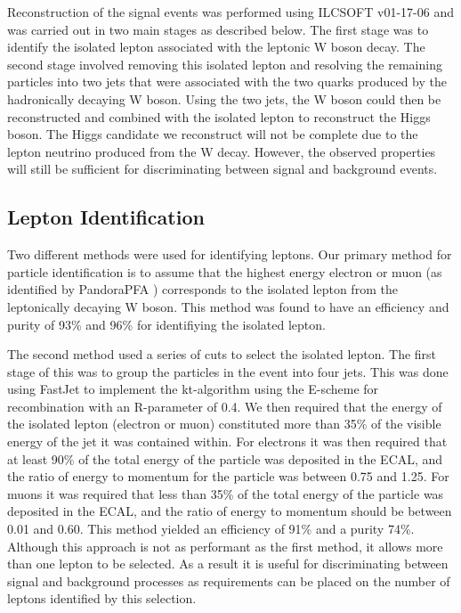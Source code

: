 Reconstruction of the signal events was performed using ILCSOFT v01-17-06 and was carried out in two main stages as described below. The first stage was to identify the isolated lepton associated with the leptonic W boson decay. The second stage involved removing this isolated lepton and resolving the remaining particles into two jets that were associated with the two quarks produced by the hadronically decaying W boson. Using the two jets, the W boson could then be reconstructed and combined with the isolated lepton to reconstruct the Higgs boson. The Higgs candidate we reconstruct will not be complete due to the lepton neutrino produced from the W decay. However, the observed properties will still be sufficient for discriminating between signal and background events.

\subsection{Lepton Identification}
Two different methods were used for identifying leptons. Our primary method for particle identification is to assume that the highest energy electron or muon (as identified by PandoraPFA \cite{Thomson200925}) corresponds to the isolated lepton from the leptonically decaying W boson. This method was found to have an efficiency and purity of 93\% and 96\% for identifiying the isolated lepton. 

The second method used a series of cuts to select the isolated lepton. The first stage of this was to group the particles in the event into four jets. This was done using FastJet \cite{Cacciari:2011ma} to implement the kt-algorithm using the E-scheme for recombination with an R-parameter of 0.4. We then required that the energy of the isolated lepton (electron or muon) constituted more than 35\% of the visible energy of the jet it was contained within. For electrons it was then required that at least 90\% of the total energy of the particle was deposited in the ECAL, and the ratio of energy to momentum for the particle was between 0.75 and 1.25. For muons it was required that less than 35\% of the total energy of the particle was deposited in the ECAL, and the ratio of energy to momentum should be between 0.01 and 0.60. This method yielded an efficiency of 91\% and a purity 74\%. Although this approach is not as performant as the first method, it allows more than one lepton to be selected. As a result it is useful for discriminating between signal and background processes as requirements can be placed on the number of leptons identified by this selection.

